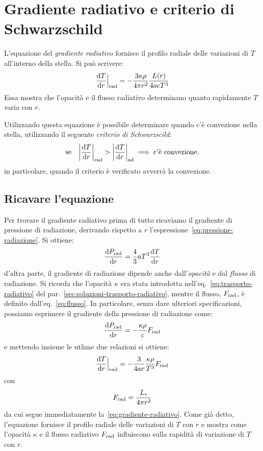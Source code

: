 \section[Gradiente radiativo]{Gradiente radiativo e criterio di Schwarzschild}\label{sec:gradiente-radiativo}
L'equazione del \emph{gradiente radiativo} fornisce il profilo radiale delle variazioni di $T$ all'interno della stella. Si può scrivere:
\begin{equation}\label{eq:gradiente-radiativo}
    \dfrac{\mathop{}\!\mathrm{d} T}{\mathop{}\!\mathrm{d} r}\Big|_\textup{rad} = - \dfrac{3 \kappa \rho}{4 \pi r^2} \dfrac{L(r)}{4 a c T^3}
\end{equation}
Essa mostra che l'opacità e il flusso radiativo determinano quanto rapidamente $T$ varia con $r$.

Utilizzando questa equazione è possibile determinare quando c'è convezione nella stella, utilizzando il seguente \emph{criterio di Schwarzscild}:
\begin{equation}\label{eq:criterio-schwarzscild}
    \text{se} \quad \abs*{\dfrac{\ud T}{\ud r}}_\textup{rad} > \abs*{\dfrac{\ud T}{\ud r}}_\textup{ad} \implies \text{c'è convezione.}
\end{equation}
in particolare, quando il criterio è verificato avverrà la convezione.

\subsection{Ricavare l'equazione}
Per trovare il gradiente radiativo prima di tutto ricaviamo il gradiente di pressione di radiazione, derivando rispetto a $r$ l'espressione~\eqref{eq:pressione-radiazione}. Si ottiene:
\[
\dfrac{\mathop{}\!\mathrm{d} P_\textup{rad}}{\mathop{}\!\mathrm{d} r} = \frac{4}{3} a T^3 \dfrac{\mathop{}\!\mathrm{d} T}{\mathop{}\!\mathrm{d} r}
\] 
d'altra parte, il gradiente di radiazione dipende anche dall'\emph{opacità} e dal \emph{flusso} di radiazione. Si ricorda che l'opacità $\kappa$ era stata introdotta nell'eq.~\eqref{eq:trasporto-radiativo} del par.~\ref{sec:soluzioni-trasporto-radiativo}, mentre il flusso, $F_\textup{rad}$, è definito dall'eq.~\eqref{eq:flusso}. In particolare, senza dare ulteriori specificazioni, possiamo esprimere il gradiente della pressione di radiazione come:
\[
\dfrac{\mathop{}\!\mathrm{d} P_\textup{rad}}{\mathop{}\!\mathrm{d} r} = -\dfrac{\kappa \rho}{c} F_\textup{rad}
\]
e mettendo insieme le utlime due relazioni si ottiene:
\[
\dfrac{\mathop{}\!\mathrm{d} T}{\mathop{}\!\mathrm{d} r}\Big|_\textup{rad} = - \dfrac{3}{4ac} \dfrac{\kappa \rho}{T^3} F_\textup{rad}
\]
con
\[
F_\textup{rad} = \dfrac{L_r}{4 \pi r^2}
\]
da cui segue immediatamente la~\eqref{eq:gradiente-radiativo}. Come già detto, l'equazione fornisce il profilo radiale delle variazioni di $T$ con $r$ e mostra come l'opacità $\kappa$ e il flusso radiativo $F_\textup{rad}$ influiscono sulla rapidità di variazione di $T$ con $r$.

